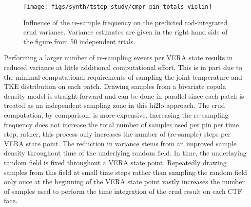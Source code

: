 \begin{figure}[H]
    \centering
    \texttt{[image: figs/synth/tstep\_study/cmpr\_pin\_totals\_violin]}
    \caption[Influence of the re-sample frequency on the predicted integrated crud variance.]{Influence of the re-sample frequency on the predicted rod-integrated crud variance.  Variance estimates are given in the right hand side of the figure from 50 independent trials.}
    \label{fig:cmprpintotalsviolin}
\end{figure}

Performing a larger number of re-sampling events per VERA state results in reduced variance at little additional computational effort.
This is in part due to the minimal computational requirements of sampling the joint temperature and TKE distribution on each patch.  Drawing samples from a bivariate copula density model is straight forward and can be done in parallel since each patch is treated as an independent sampling zone in this hi2lo approach.  The crud computation, by comparison, is more expensive.  Increasing the re-sampling frequency does not increase the total number of samples used per pin per time step, rather, this process only increases the number of (re-sample) steps per VERA state point.  The reduction in variance stems from an improved sample density throughout time of the underlying random field.  In time, the underlaying random field is fixed throughout a VERA state point.  Repeatedly drawing samples from this field at small time steps rather than sampling the random field only once at the beginning of the VERA state point vastly increases the number of samples used to perform the time integration of the crud result on each CTF face.



